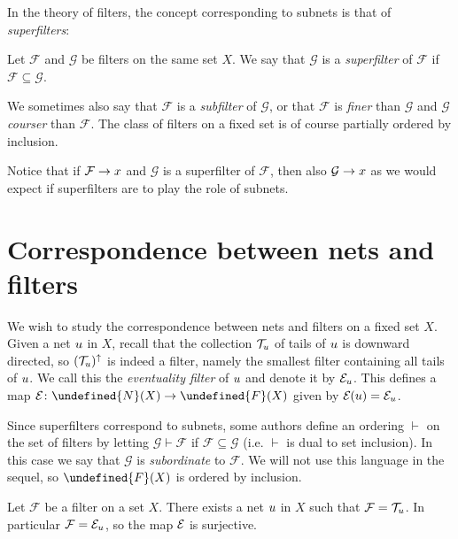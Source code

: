 \documentclass[article, a4paper, 11pt, oneside]{memoir}
\let\mathfrak\undefined
\numberwithin{equation}{chapter}
\newcommand{\calF}{\mathcal{F}}
\newcommand{\calG}{\mathcal{G}}
\theoremstyle{nonumberplain}
\begin{document}
In the theory of filters, the concept corresponding to subnets is that of \emph{superfilters}:

\begin{definition}[Superfilters]
    Let $\calF$ and $\calG$ be filters on the same set $X$. We say that $\calG$ is a \emph{superfilter} of $\calF$ if $\calF \subseteq \calG$.
\end{definition}
%
We sometimes also say that $\calF$ is a \emph{subfilter} of $\calG$, or that $\calF$ is \emph{finer} than $\calG$ and $\calG$ \emph{courser} than $\calF$. The class of filters on a fixed set is of course partially ordered by inclusion.

Notice that if $\calF \to \mylimit$ and $\calG$ is a superfilter of $\calF$, then also $\calG \to \mylimit$ as we would expect if superfilters are to play the role of subnets.


\chapter{Correspondence between nets and filters}

\newcommand{\filter}{\mathfrak{F}}

\newcommand{\filters}[1]{\mathfrak{F}(#1)}
\newcommand{\nets}[1]{\mathfrak{N}(#1)}
\newcommand{\netseq}[1]{\tilde{\mathfrak{N}}(#1)}

\newcommand{\subord}{\vdash}

We wish to study the correspondence between nets and filters on a fixed set $X$. Given a net $\mynet$ in $X$, recall that the collection $\tails{\mynet}$ of tails of $\mynet$ is downward directed, so $(\tails{\mynet})^\uparrow$ is indeed a filter, namely the smallest filter containing all tails of $\mynet$. We call this the \emph{eventuality filter} of $\mynet$ and denote it by $\evfilt[\mynet]$. This defines a map $\evfilt \colon \nets{X} \to \filters{X}$ given by $\evfilt(\mynet) = \evfilt[\mynet]$.

Since superfilters correspond to subnets, some authors define an ordering $\subord$ on the set of filters by letting $\calG \subord \calF$ if $\calF \subseteq \calG$ (i.e. $\subord$ is dual to set inclusion). In this case we say that $\calG$ is \emph{subordinate} to $\calF$. We will not use this language in the sequel, so $\filters{X}$ is ordered by inclusion.

\begin{lemma}
    Let $\calF$ be a filter on a set $X$. There exists a net $\mynet$ in $X$ such that $\calF = \tails{\mynet}$. In particular $\calF = \evfilt[\mynet]$, so the map $\evfilt$ is surjective.
\end{lemma}
\end{document}
